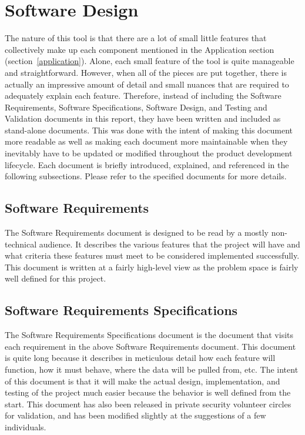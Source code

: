 \documentclass[letterpaper,12pt]{article}
\begin{document}
\section{Software Design}
The nature of this tool is that there are a lot of small little features that
collectively make up each component mentioned in the Application section
(section~\ref{application}).  Alone, each small feature of the tool is quite
manageable and straightforward.  However, when all of the pieces are put
together, there is actually an impressive amount of detail and small nuances
that are required to adequately explain each feature.  Therefore, instead of
including the Software Requirements, Software Specifications, Software Design,
and Testing and Validation documents in this report, they have been written and
included as stand-alone documents.  This was done with the intent of making this
document more readable as well as making each document more maintainable when
they inevitably have to be updated or modified throughout the product
development lifecycle.  Each document is briefly introduced, explained, and
referenced in the following subsections.  Please refer to the specified
documents for more details.

\subsection{Software Requirements}
\label{software_requirements}
The Software Requirements document \cite{Requirements} is designed to be read by
a mostly non-technical audience.  It describes the various features that the
project will have and what criteria these features must meet to be considered
implemented successfully.  This document is written at a fairly high-level view
as the problem space is fairly well defined for this project.

\subsection{Software Requirements Specifications}
\label{software_specifications}
The Software Requirements Specifications document \cite{Specification} is the
document that visits each requirement in the above Software Requirements
document.  This document is quite long because it describes in meticulous detail
how each feature will function, how it must behave, where the data will be
pulled from, etc.  The intent of this document is that it will make the actual
design, implementation, and testing of the project much easier because the
behavior is well defined from the start.  This document has also been released
in private security volunteer circles for validation, and has been modified
slightly at the suggestions of a few individuals.
\end{document}
